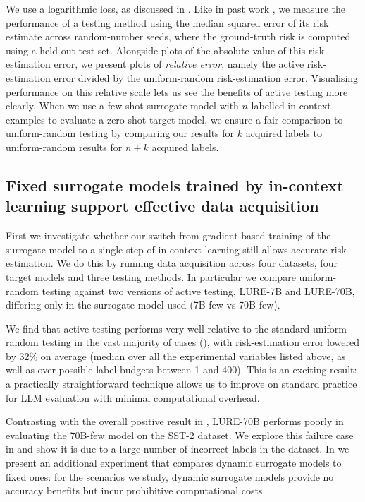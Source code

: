 We use a logarithmic loss, as discussed in . 
Like in past work \citep{kossen2021active,kossen2022active}, we measure the performance of a testing method using the median squared error of its risk estimate across random-number seeds, where the ground-truth risk is computed using a held-out test set.
Alongside plots of the absolute value of this risk-estimation error, we present plots of \emph{relative error}, namely the active risk-estimation error divided by the uniform-random risk-estimation error.
Visualising performance on this relative scale lets us see the benefits of active testing more clearly.
When we use a few-shot surrogate model with $n$ labelled in-context examples to evaluate a zero-shot target model, we ensure a fair comparison to uniform-random testing by comparing our results for $k$ acquired labels to uniform-random results for $n+k$ acquired labels.

\subsection{Fixed surrogate models trained by in-context learning support effective data acquisition}\label{sec:basic_surrogates_work}

First we investigate whether our switch from gradient-based training of the surrogate model to a single step of in-context learning still allows accurate risk estimation.
We do this by running data acquisition across four datasets, four target models and three testing methods.
In particular we compare uniform-random testing against two versions of active testing, LURE-7B and LURE-70B, differing only in the surrogate model used (7B-few vs 70B-few).

We find that active testing performs very well relative to the standard uniform-random testing in the vast majority of cases (), with risk-estimation error lowered by 32\% on average (median over all the experimental variables listed above, as well as over possible label budgets between 1 and 400).
This is an exciting result: a practically straightforward technique allows us to improve on standard practice for LLM evaluation with minimal computational overhead.

Contrasting with the overall positive result in , LURE-70B performs poorly in evaluating the 70B-few model on the SST-2 dataset.
We explore this failure case in  and show it is due to a large number of incorrect labels in the dataset.
In  we present an additional experiment that compares dynamic surrogate models to fixed ones: for the scenarios we study, dynamic surrogate models provide no accuracy benefits but incur prohibitive computational costs.


